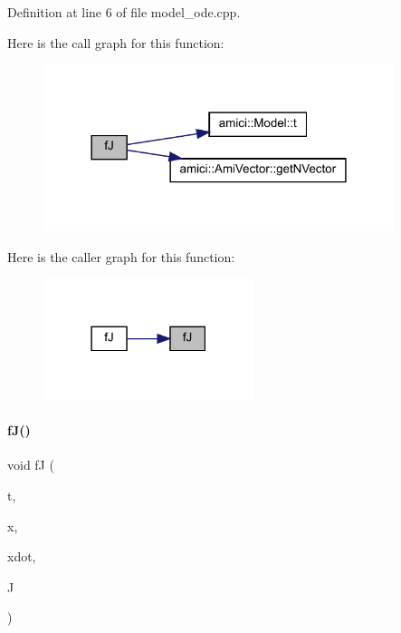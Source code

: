 Definition at line 6 of file model\+\_\+ode.\+cpp.

Here is the call graph for this function\+:
\nopagebreak
\begin{figure}[H]
\begin{center}
\leavevmode
\includegraphics[width=290pt]{classamici_1_1_model___o_d_e_a99337eaeac6c70528c3464affe13df2e_cgraph}
\end{center}
\end{figure}
Here is the caller graph for this function\+:
\nopagebreak
\begin{figure}[H]
\begin{center}
\leavevmode
\includegraphics[width=174pt]{classamici_1_1_model___o_d_e_a99337eaeac6c70528c3464affe13df2e_icgraph}
\end{center}
\end{figure}
\mbox{\label{classamici_1_1_model___o_d_e_aa2c40d6808a333eee2a96e6737d85161}} 
\paragraph{\texorpdfstring{fJ()}{fJ()}\hspace{0.1cm}{\footnotesize\ttfamily [2/3]}}
{\footnotesize\ttfamily void fJ (\begin{DoxyParamCaption}\item[{\mbox{\hyperlink{namespaceamici_a1bdce28051d6a53868f7ccbf5f2c14a3}{realtype}}}]{t,  }\item[{N\+\_\+\+Vector}]{x,  }\item[{N\+\_\+\+Vector}]{xdot,  }\item[{Dls\+Mat}]{J }\end{DoxyParamCaption})}

